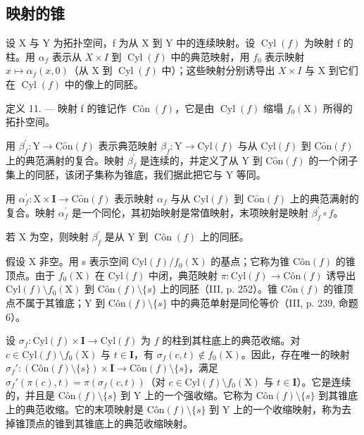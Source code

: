 \subsection{映射的锥}

设 X 与 Y 为拓扑空间，f 为从 X 到 Y 中的连续映射。设 \(\operatorname{Cyl}(f)\) 为映射 f 的柱。用 \(\alpha_{f}\) 表示从 \(X \times I\) 到 \(\operatorname{Cyl}(f)\) 中的典范映射，用 \(f_{0}\) 表示映射 \(x \mapsto \alpha_{f}(x,0)\)（从 X 到 \(\operatorname{Cyl}(f)\) 中）；这些映射分别诱导出 \(X \times I\) 与 X 到它们在 \(\operatorname{Cyl}(f)\) 中的像上的同胚。

定义 11. --- 映射 f 的锥记作 \(\operatorname{Côn}(f)\)，它是由 \(\operatorname{Cyl}(f)\) 缩塌 \(f_{0}(\mathrm{X})\) 所得的拓扑空间。

用 \(\beta_{f}^{\prime}\colon\mathrm{Y}\to\mathrm{C}\hat{\mathrm{o}}\mathrm{n}(f)\) 表示典范映射 \(\beta_{f}\colon\mathrm{Y}\to\mathrm{C}\mathrm{y}\mathrm{l}(f)\) 与从 \(\mathrm{C}\mathrm{y}\mathrm{l}(f)\) 到 \(\mathrm{C}\hat{\mathrm{o}}\mathrm{n}(f)\) 上的典范满射的复合。映射 \(\beta_{f}^{\prime}\) 是连续的，并定义了从 Y 到 \(\mathrm{C}\hat{\mathrm{o}}\mathrm{n}(f)\) 的一个闭子集上的同胚，该闭子集称为锥底，我们据此把它与 Y 等同。

用 \(\alpha_{f}^{\prime}\colon\mathrm{X}\times\mathbf{I}\to\mathrm{C}\hat{\mathrm{o}}\mathrm{n}(f)\) 表示映射 \(\alpha_{f}\) 与从 \(\mathrm{Cyl}(f)\) 到 \(\mathrm{C}\hat{\mathrm{o}}\mathrm{n}(f)\) 上的典范满射的复合。映射 \(\alpha_{f}^{\prime}\) 是一个同伦，其初始映射是常值映射，末项映射是映射 \(\beta_{f}^{\prime}\circ f\)。

若 X 为空，则映射 \(\beta_{f}^{\prime}\) 是从 Y 到 \(\operatorname{Côn}(f)\) 上的同胚。

假设 X 非空。用 s 表示空间 \(\mathrm{Cyl}(f)/f_{0}(\mathrm{X})\) 的基点；它称为锥 \(\mathrm{Côn}(f)\) 的锥顶点。由于 \(f_{0}(\mathrm{X})\) 在 \(\mathrm{Cyl}(f)\) 中闭，典范映射 \(\pi\colon\mathrm{Cyl}(f)\to\mathrm{Côn}(f)\) 诱导出 \(\mathrm{Cyl}(f)\setminus f_{0}(\mathrm{X})\) 到 \(\mathrm{Côn}(f)\setminus\{s\}\) 上的同胚（III, p. 252）。锥 \(\mathrm{Côn}(f)\) 的锥顶点不属于其锥底；Y 到 \(\mathrm{Côn}(f)\setminus\{s\}\) 中的典范单射是同伦等价（III, p. 239, 命题 6）。

设 \(\sigma_f\colon \mathrm{Cyl}(f)\times \mathbf{I}\to \mathrm{Cyl}(f)\) 为 \(f\) 的柱到其柱底上的典范收缩。对 \(c\in \mathrm{Cyl}(f)\setminus f_0(\mathrm{X})\) 与 \(t\in \mathbf{I}\)，有 \(\sigma_f(c,t)\notin f_0(\mathrm{X})\)。因此，存在唯一的映射 \(\sigma_f'\colon (\mathrm{Côn}(f)\setminus\{s\})\times \mathbf{I}\to \mathrm{Côn}(f)\setminus\{s\}\)，满足 \(\sigma_f'(\pi(c),t)=\pi(\sigma_f(c,t))\)（对 \(c\in \mathrm{Cyl}(f)\setminus f_0(\mathrm{X})\) 与 \(t\in \mathbf{I}\)）。它是连续的，并且是 \(\mathrm{Côn}(f)\setminus\{s\}\) 到 Y 上的一个强收缩。它称为 \(\mathrm{Côn}(f)\setminus\{s\}\) 到其锥底上的典范收缩。它的末项映射是 \(\mathrm{Côn}(f)\setminus\{s\}\) 到 Y 上的一个收缩映射，称为去掉锥顶点的锥到其锥底上的典范收缩映射。


